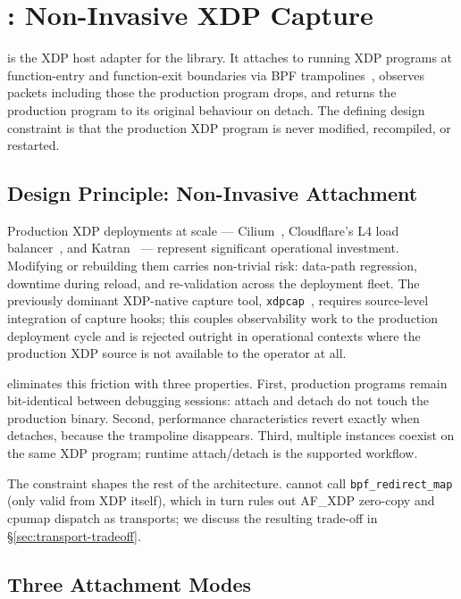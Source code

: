 \section{\xdpninja: Non-Invasive XDP Capture}
\label{sec:xdp-ninja}

\xdpninja is the XDP host adapter for the \kunai library. It attaches
to running XDP programs at function-entry and function-exit boundaries
via BPF trampolines~\cite{hoiland2018xdp}, observes packets including
those the production program drops, and returns the production program
to its original behaviour on detach. The defining design constraint
is that the production XDP program is never modified, recompiled, or
restarted.

\subsection{Design Principle: Non-Invasive Attachment}
\label{sec:non-invasive}

Production XDP deployments at scale --- Cilium~\cite{cilium_docs},
Cloudflare's L4 load balancer~\cite{cloudflare_unimog}, and
Katran~\cite{shukla2020katran} --- represent significant operational
investment. Modifying or rebuilding them carries non-trivial risk:
data-path regression, downtime during reload, and re-validation across
the deployment fleet. The previously dominant XDP-native capture tool,
\texttt{xdpcap}~\cite{cloudflare2019xdpcap}, requires source-level
integration of capture hooks; this couples observability work to the
production deployment cycle and is rejected outright in operational
contexts where the production XDP source is not available to the
operator at all.

\xdpninja eliminates this friction with three properties. First,
production programs remain bit-identical between debugging sessions:
attach and detach do not touch the production binary. Second,
performance characteristics revert exactly when \xdpninja detaches,
because the trampoline disappears. Third, multiple \xdpninja
instances coexist on the same XDP program; runtime attach/detach is
the supported workflow.

The constraint shapes the rest of the architecture. \xdpninja cannot
call \texttt{bpf\_redirect\_map} (only valid from XDP itself), which
in turn rules out AF\_XDP zero-copy and cpumap dispatch as transports;
we discuss the resulting trade-off in \S\ref{sec:transport-tradeoff}.

\subsection{Three Attachment Modes}
\label{sec:attach-modes}

